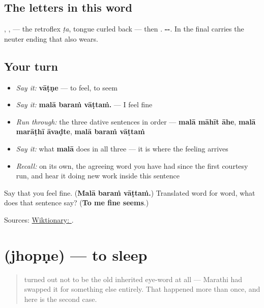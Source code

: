 \subsection*{The letters in this word}
\textbf{}, \textbf{}, \textbf{} — the retroflex \emph{ṭa}, tongue curled back — then \textbf{}. \textbf{--}. In \textbf{} the final \textbf{} carries the neuter ending that \textbf{} also wears.

\subsection*{Your turn}
\begin{itemize}
\raggedright
  \item \emph{Say it:} \textbf{vāṭṇe} — to feel, to seem
  \item \emph{Say it:} \textbf{malā baraṁ vāṭtaṁ.} — I feel fine
  \item \emph{Run through:} the three dative sentences in order — \textbf{malā māhīt āhe}, \textbf{malā marāṭhī āvaḍte}, \textbf{malā baraṁ vāṭtaṁ}
  \item \emph{Say it:} what \textbf{malā} does in all three — it is where the feeling arrives
  \item \emph{Recall:} \textbf{} on its own, the agreeing word you have had since the first courtesy run, and hear it doing new work inside this sentence
\end{itemize}

\begin{tcolorbox}[breakable,colback=teal!4,colframe=teal!35!black,title={Before you move on}]
Say that you feel fine. (\textbf{Malā baraṁ vāṭtaṁ.}) Translated word for word, what does that sentence say? (\textbf{To me fine seems}.)

Sources: \href{https://en.wiktionary.org/wiki/\%E0\%A4\%B5\%E0\%A4\%BE\%E0\%A4\%9F\%E0\%A4\%A3\%E0\%A5\%87}{Wiktionary: }.
\end{tcolorbox}
\section[\texorpdfstring{\mr{झोपणे} (jhopṇe)}{झोपणे (jhopṇe)}]{ (jhopṇe) — to sleep}

\label{lesson:MR-C23-jhopne}



\begin{quote}
\textbf{} turned out not to be the old inherited eye-word at all — Marathi had swapped it for something else entirely. That happened more than once, and here is the second case.
\end{quote}

